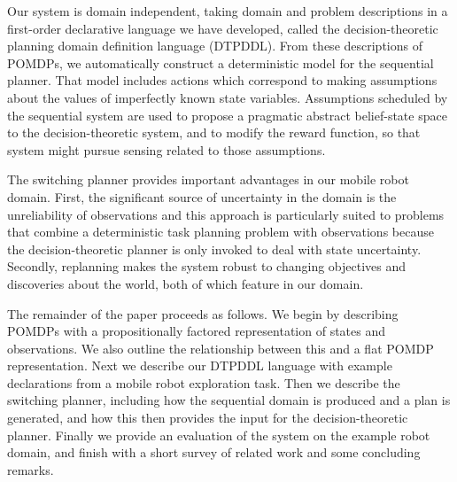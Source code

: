 Our system is domain independent, taking domain and problem
descriptions in a first-order declarative language we have developed,
called the decision-theoretic planning domain definition language
(DTPDDL). From these descriptions of POMDPs, we automatically
construct a deterministic model for the sequential planner. That model
includes actions which correspond to making assumptions about the values of
imperfectly known state variables. Assumptions scheduled by the
sequential system are used to propose a pragmatic abstract
belief-state space to the decision-theoretic system, and to modify the
reward function, so that system might pursue sensing related to those
assumptions.





The switching planner provides important advantages in our
mobile robot domain. First, the significant source of uncertainty in the
domain is the unreliability of observations and this approach is
particularly suited to problems that combine a deterministic task
planning problem with observations because the decision-theoretic planner
is only invoked to deal with state uncertainty.
Secondly, replanning makes the system robust to
changing objectives and discoveries about the world,
both of which feature in our domain.

The remainder of the paper proceeds as follows. We begin by describing
POMDPs with a propositionally factored representation of states and
observations. We also outline the relationship between this and a flat
POMDP representation. Next we describe our DTPDDL language with
example declarations from a mobile robot exploration task. Then we
describe the switching planner, including how the sequential domain is
produced and a plan is generated, and how this then provides the input
for the decision-theoretic planner. Finally we provide an evaluation
of the system on the example robot domain, and finish with a short
survey of related work and some concluding remarks.






